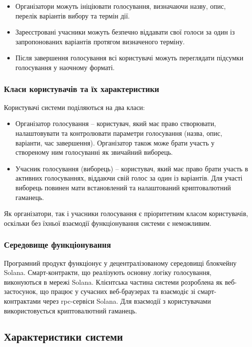 \documentclass[14pt]{extreport}
\begin{document}
  \begin{itemize}
    \item Організатори можуть ініціювати голосування, визначаючи назву, опис, перелік варіантів вибору та термін дії.
    \item Зареєстровані учасники можуть безпечно віддавати свої голоси за один із запропонованих варіантів протягом визначеного терміну.
    \item Після завершення голосування всі користувачі можуть переглядати підсумки голосування у наочному форматі.
  \end{itemize}
  
  \subsubsection{Класи користувачів та їх характеристики}
  Користувачі системи поділяються на два класи:
  \begin{itemize}
    \item Організатор голосування – користувач, який має право створювати, налаштовувати та контролювати параметри голосування (назва, опис, варіанти, час завершення). Організатор також може брати участь у створеному ним голосуванні як звичайний виборець.
    \item Учасник голосування (виборець) – користувач, який має право брати участь в активних голосуваннях, віддаючи свій голос за один із варіантів. Для участі виборець повинен мати встановлений та налаштований криптовалютний гаманець. 
  \end{itemize}
  
  Як організатори, так і учасники голосування є пріоритетним класом користувачів, оскільки без їхньої взаємодії функціонування системи є неможливим.
  
  \subsubsection{Середовище функціонування}
  Програмний продукт функціонує у децентралізованому середовищі блокчейну Solana. Смарт-контракти, що реалізують основну логіку голосування, виконуються в мережі Solana. Клієнтська частина системи розроблена як веб-застосунок, що працює у сучасних веб-браузерах та взаємодіє зі смарт-контрактами через \gls{rpc}-сервіси Solana. Для взаємодії з користувачами використовується криптовалютний гаманець.

  \subsection{Характеристики системи}
\end{document}
